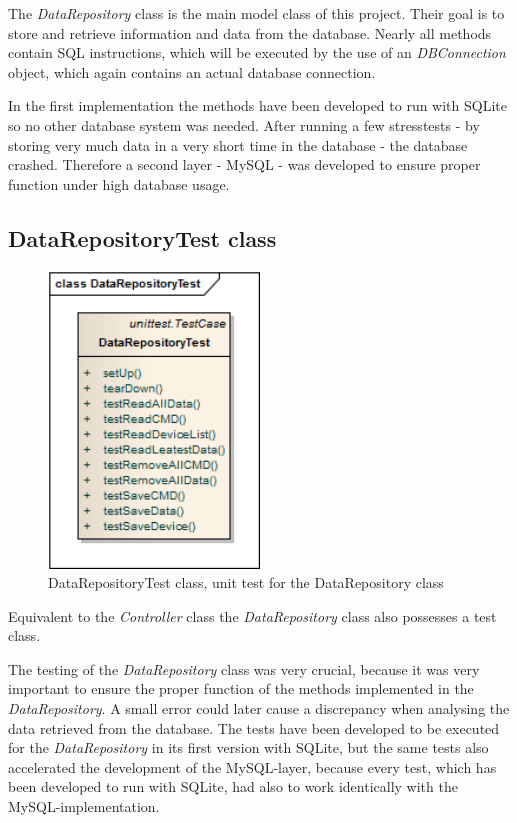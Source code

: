 The \textit{DataRepository} class is the main model class of this project. 
Their goal is to store and retrieve information and data from the database. 
Nearly all methods contain SQL instructions, 
which will be executed by the use of an \textit{DBConnection} object, which again contains an actual database connection.

In the first implementation the methods have been developed to run with SQLite so no other database system was needed. After running a few stresstests - by storing very much data in a very short time in the database - the database crashed. Therefore a second layer - MySQL - was developed to ensure proper function under high database usage.

\newpage
\subsection{DataRepositoryTest class}
\begin{figure}[H]
   \centering
   \includegraphics[width=0.5\textwidth]{pic/DataRepositoryTest.png}%
   \caption{DataRepositoryTest class, unit test for the DataRepository class}
   \label{DataRepositoryTestpic}%
\end{figure}

Equivalent to the \textit{Controller} class the \textit{DataRepository} class also possesses a test class.

The testing of the \textit{DataRepository} class was very crucial, because it was very important to ensure the proper function of the methods implemented in the \textit{DataRepository}. A small error could later cause a discrepancy when analysing the data retrieved from the database. 
The tests have been developed to be executed for the \textit{DataRepository} in its first version with SQLite, but the same tests also accelerated the development of the MySQL-layer, because every test, which has been developed to run with SQLite, had also to work identically with the MySQL-implementation.


